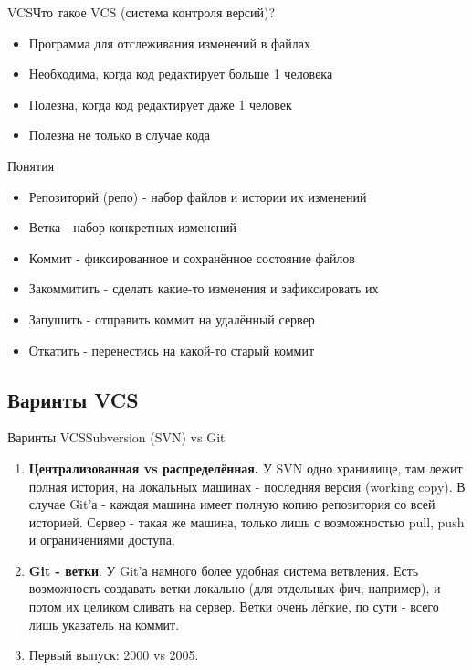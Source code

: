\documentclass[10pt]{beamer}
\begin{document}
\begin{frame}[fragile]{VCS}{Что такое VCS (система контроля версий)?}
\begin{itemize}
    \item Программа для отслеживания изменений в файлах
    \item Необходима, когда код редактирует больше 1 человека
    \item Полезна, когда код редактирует даже 1 человек
    \item Полезна не только в случае кода
\end{itemize}
\end{frame}

\begin{frame}[fragile]{Понятия}
\begin{itemize}
    \item Репозиторий (репо) - набор файлов и истории их изменений
    \item Ветка - набор конкретных изменений
    \item Коммит - фиксированное и сохранённое состояние файлов
    \item Закоммитить - сделать какие-то изменения и зафиксировать их
    \item Запушить - отправить коммит на удалённый сервер
    \item Откатить - перенестись на какой-то старый коммит
\end{itemize}
\end{frame}

\subsection{Варинты VCS}
\begin{frame}[fragile]{Варинты VCS}{Subversion (SVN) vs Git}
\begin{enumerate}
\item \textbf{Централизованная  vs распределённая.} У SVN одно хранилище, там лежит полная история, на локальных машинах - последняя версия (working copy). В случае Git'а - каждая машина имеет полную копию репозитория со всей историей. Сервер - такая же машина, только лишь с возможностью pull, push и ограничениями доступа.
\item \textbf{Git - ветки}. У Git'а намного более удобная система ветвления. Есть возможность создавать ветки локально (для отдельных фич, например), и потом их целиком сливать на сервер. Ветки очень лёгкие, по сути - всего лишь указатель на коммит.
\item  Первый выпуск: 2000 vs 2005.
\end{enumerate}
\end{frame}
\end{document}

